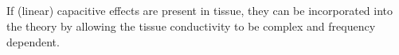 %
%
%
%
%

\subsection{}
\label{sec:Sigma:Complex}
If (linear) capacitive effects are present in tissue, 
they can be incorporated into the theory by allowing the tissue conductivity to be complex and frequency dependent.

